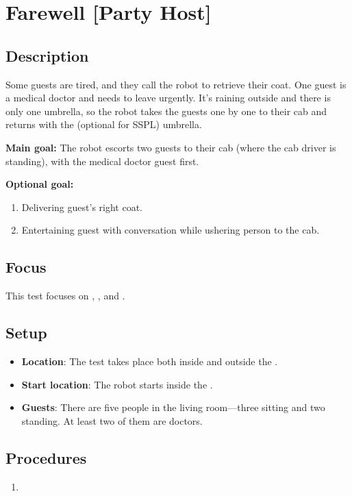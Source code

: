 \section{Farewell [Party Host]}
\label{test:farewell}

\subsection*{Description}
    Some guests are tired, and they call the robot to retrieve their coat. One guest is a medical doctor and needs to leave urgently. It's raining outside and there is only one umbrella, so the robot takes the guests one by one to their cab and returns with the (optional for SSPL) umbrella.


\textbf{Main goal:}
The robot escorts two guests to their cab (where the cab driver is standing), with the medical doctor guest first.


\textbf{Optional goal:}
\begin{enumerate}[nosep]
	\item Delivering guest's right coat.
	\item Entertaining guest with conversation while ushering person to the cab.
\end{enumerate}

\subsection*{Focus}
This test focuses on \PerDet{}, \NAV{}, and \HRI{}.

\subsection*{Setup}
\begin{itemize}
	\item \textbf{Location}: The test takes place both inside and outside the \Arena{}.
	\item \textbf{Start location}: The robot starts inside the \Arena{}.
	\item \textbf{Guests}: There are five people in the living room---three sitting and two standing. At least two of them are doctors.
\end{itemize}

\subsection*{Procedures}
\begin{enumerate}
    \item 
\end{enumerate}

